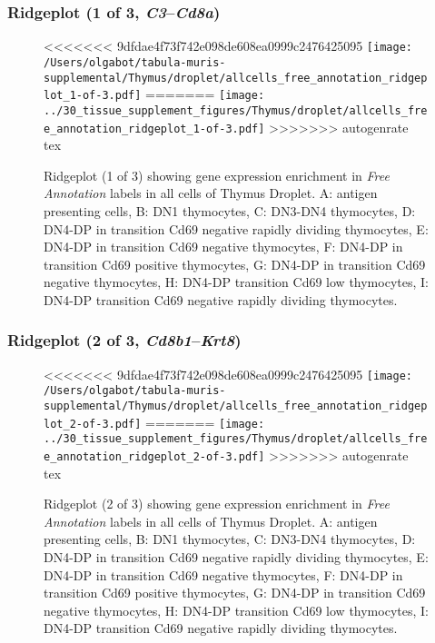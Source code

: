\clearpage

\subsubsection{Ridgeplot (1 of 3, \emph{C3}--\emph{Cd8a})}
\begin{figure}[h]
\centering
<<<<<<< 9dfdae4f73f742e098de608ea0999c2476425095
\texttt{[image: /Users/olgabot/tabula-muris-supplemental/Thymus/droplet/allcells\_free\_annotation\_ridgeplot\_1-of-3.pdf]}
=======
\texttt{[image: ../30\_tissue\_supplement\_figures/Thymus/droplet/allcells\_free\_annotation\_ridgeplot\_1-of-3.pdf]}
>>>>>>> autogenrate tex

\caption{ Ridgeplot (1 of 3)  showing gene expression enrichment in \emph{Free Annotation} labels in all cells of Thymus Droplet. A: antigen presenting cells, B: DN1 thymocytes, C: DN3-DN4 thymocytes, D: DN4-DP in transition Cd69 negative rapidly dividing thymocytes, E: DN4-DP in transition Cd69 negative thymocytes, F: DN4-DP in transition Cd69 positive thymocytes, G: DN4-DP in transition Cd69 negative thymocytes, H: DN4-DP transition Cd69 low thymocytes, I: DN4-DP transition Cd69 negative rapidly dividing thymocytes.}
\end{figure}


\clearpage

\subsubsection{Ridgeplot (2 of 3, \emph{Cd8b1}--\emph{Krt8})}
\begin{figure}[h]
\centering
<<<<<<< 9dfdae4f73f742e098de608ea0999c2476425095
\texttt{[image: /Users/olgabot/tabula-muris-supplemental/Thymus/droplet/allcells\_free\_annotation\_ridgeplot\_2-of-3.pdf]}
=======
\texttt{[image: ../30\_tissue\_supplement\_figures/Thymus/droplet/allcells\_free\_annotation\_ridgeplot\_2-of-3.pdf]}
>>>>>>> autogenrate tex

\caption{ Ridgeplot (2 of 3)  showing gene expression enrichment in \emph{Free Annotation} labels in all cells of Thymus Droplet. A: antigen presenting cells, B: DN1 thymocytes, C: DN3-DN4 thymocytes, D: DN4-DP in transition Cd69 negative rapidly dividing thymocytes, E: DN4-DP in transition Cd69 negative thymocytes, F: DN4-DP in transition Cd69 positive thymocytes, G: DN4-DP in transition Cd69 negative thymocytes, H: DN4-DP transition Cd69 low thymocytes, I: DN4-DP transition Cd69 negative rapidly dividing thymocytes.}
\end{figure}


